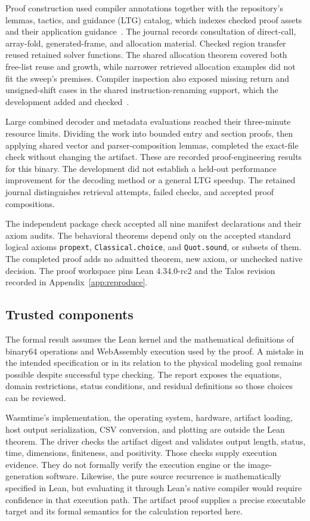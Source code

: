 \documentclass[11pt]{article}
\newcommand{\code}[1]{\texttt{#1}}
\begin{document}
Proof construction used compiler annotations together with the repository's lemmas, tactics, and guidance (LTG) catalog, which indexes checked proof assets and their application guidance~\cite{ltg}.  The journal records consultation of direct-call, array-fold, generated-frame, and allocation material.  Checked region transfer reused retained solver functions.  The shared allocation theorem covered both free-list reuse and growth, while narrower retrieved allocation examples did not fit the sweep's premises.  Compiler inspection also exposed missing return and unsigned-shift cases in the shared instruction-renaming support, which the development added and checked~\cite{journal}.

Large combined decoder and metadata evaluations reached their three-minute resource limits.  Dividing the work into bounded entry and section proofs, then applying shared vector and parser-composition lemmas, completed the exact-file check without changing the artifact.  These are recorded proof-engineering results for this binary.  The development did not establish a held-out performance improvement for the decoding method or a general LTG speedup.  The retained journal distinguishes retrieval attempts, failed checks, and accepted proof compositions.

The independent package check accepted all nine manifest declarations and their axiom audits.  The behavioral theorems depend only on the accepted standard logical axioms \code{propext}, \code{Classical.choice}, and \code{Quot.sound}, or subsets of them.  The completed proof adds no admitted theorem, new axiom, or unchecked native decision.  The proof workspace pins Lean 4.34.0-rc2 and the Talos revision recorded in Appendix~\ref{app:reproduce}.

\subsection{Trusted components}
\label{sec:trusted}

The formal result assumes the Lean kernel and the mathematical definitions of binary64 operations and WebAssembly execution used by the proof.  A mistake in the intended specification or in its relation to the physical modeling goal remains possible despite successful type checking.  The report exposes the equations, domain restrictions, status conditions, and residual definitions so those choices can be reviewed.

Wasmtime's implementation, the operating system, hardware, artifact loading, host output serialization, CSV conversion, and plotting are outside the Lean theorem.  The driver checks the artifact digest and validates output length, status, time, dimensions, finiteness, and positivity.  Those checks supply execution evidence.  They do not formally verify the execution engine or the image-generation software.  Likewise, the pure source recurrence is mathematically specified in Lean, but evaluating it through Lean's native compiler would require confidence in that execution path.  The artifact proof supplies a precise executable target and its formal semantics for the calculation reported here.
\end{document}
